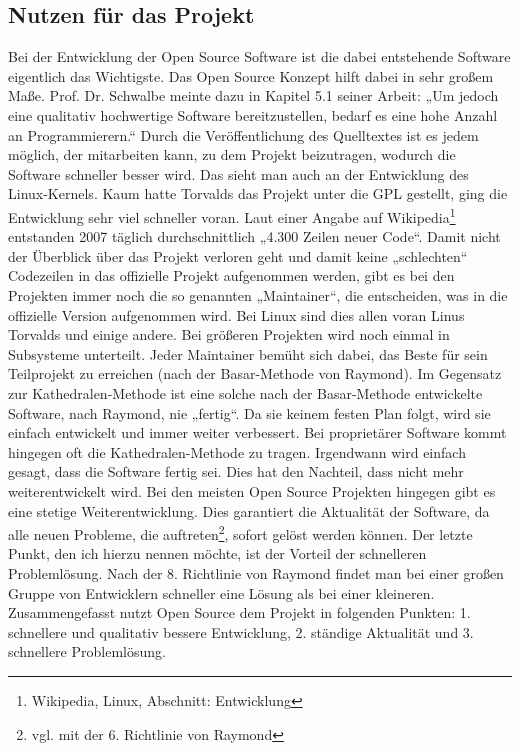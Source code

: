\documentclass[a4paper,12pt]{article}
\begin{document}
\subsection{Nutzen für das Projekt}
Bei der Entwicklung der Open Source Software ist die dabei entstehende Software eigentlich das Wichtigste. Das Open Source Konzept hilft dabei in sehr großem Maße. Prof. Dr. Schwalbe meinte dazu in Kapitel 5.1 seiner Arbeit: „Um jedoch eine qualitativ hochwertige Software bereitzustellen, bedarf es eine hohe Anzahl an Programmierern.“ Durch die Veröffentlichung des Quelltextes ist es jedem möglich, der mitarbeiten kann, zu dem Projekt beizutragen, wodurch die Software schneller besser wird. Das sieht man auch an der Entwicklung des Linux-Kernels. Kaum hatte Torvalds das Projekt unter die GPL gestellt, ging die Entwicklung sehr viel schneller voran. Laut einer Angabe auf Wikipedia\footnote{Wikipedia, Linux, Abschnitt: Entwicklung} entstanden 2007 täglich durchschnittlich „4.300 Zeilen neuer Code“. Damit nicht der Überblick über das Projekt verloren geht und damit keine „schlechten“ Codezeilen in das offizielle Projekt aufgenommen werden, gibt es bei den Projekten immer noch die so genannten „Maintainer“, die entscheiden, was in die offizielle Version aufgenommen wird. Bei Linux sind dies allen voran Linus Torvalds und einige andere. Bei größeren Projekten wird noch einmal in Subsysteme unterteilt. Jeder Maintainer bemüht sich dabei, das Beste für sein Teilprojekt zu erreichen (nach der Basar-Methode von Raymond). Im Gegensatz zur Kathedralen-Methode ist eine solche nach der Basar-Methode entwickelte Software, nach Raymond, nie „fertig“. Da sie keinem festen Plan folgt, wird sie einfach entwickelt und immer weiter verbessert. Bei proprietärer Software kommt hingegen oft die Kathedralen-Methode zu tragen. Irgendwann wird einfach gesagt, dass die Software fertig sei. Dies hat den Nachteil, dass nicht mehr weiterentwickelt wird. Bei den meisten Open Source Projekten hingegen gibt es eine stetige Weiterentwicklung. Dies garantiert die Aktualität der Software, da alle neuen Probleme, die auftreten\footnote{vgl. mit der 6. Richtlinie von Raymond}, sofort gelöst werden können. Der letzte Punkt, den ich hierzu nennen möchte, ist der Vorteil der schnelleren Problemlösung. Nach der 8. Richtlinie von Raymond findet man bei einer großen Gruppe von Entwicklern schneller eine Lösung als bei einer kleineren.
\\Zusammengefasst nutzt Open Source dem Projekt in folgenden Punkten: 1. schnellere und qualitativ bessere Entwicklung, 2. ständige Aktualität und 3. schnellere Problemlösung.
\end{document}
